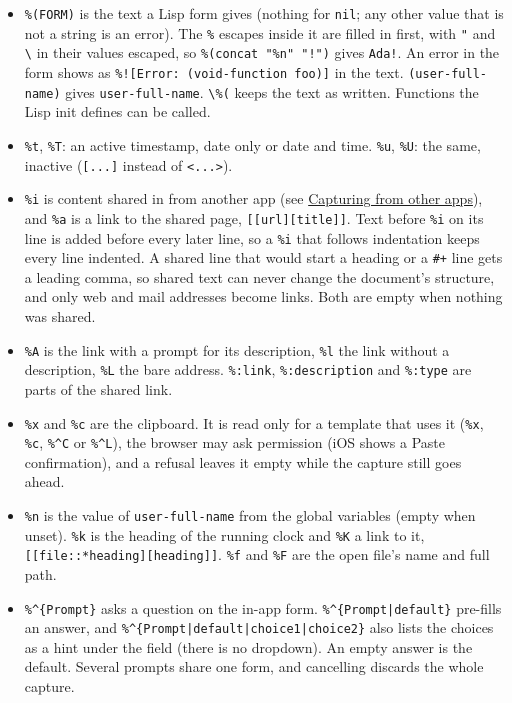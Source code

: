 \documentclass[11pt]{article}
\begin{document}
\begin{itemize}
\item \texttt{\%(FORM)} is the text a Lisp form gives (nothing for \texttt{nil}; any other value that is not a string is an error). The \texttt{\%} escapes inside it are filled in first, with \texttt{"} and \texttt{\textbackslash{}} in their values escaped, so \texttt{\%(concat "\%n" "!")} gives \texttt{Ada!}. An error in the form shows as \texttt{\%![Error: (void-function foo)]} in the text. \texttt{(user-full-name)} gives \texttt{user-full-name}. \texttt{\textbackslash{}\%(} keeps the text as written. Functions the Lisp init defines can be called.
\item \texttt{\%t}, \texttt{\%T}: an active timestamp, date only or date and time. \texttt{\%u}, \texttt{\%U}: the same, inactive (\texttt{[...]} instead of \texttt{<...>}).
\item \texttt{\%i} is content shared in from another app (see \hyperref[sec:org46417ca]{Capturing from other apps}), and \texttt{\%a} is a link to the shared page, \texttt{[[url][title]]}. Text before \texttt{\%i} on its line is added before every later line, so a \texttt{\%i} that follows indentation keeps every line indented. A shared line that would start a heading or a \texttt{\#+} line gets a leading comma, so shared text can never change the document's structure, and only web and mail addresses become links. Both are empty when nothing was shared.
\item \texttt{\%A} is the link with a prompt for its description, \texttt{\%l} the link without a description, \texttt{\%L} the bare address. \texttt{\%:link}, \texttt{\%:description} and \texttt{\%:type} are parts of the shared link.
\item \texttt{\%x} and \texttt{\%c} are the clipboard. It is read only for a template that uses it (\texttt{\%x}, \texttt{\%c}, \texttt{\%\textasciicircum{}C} or \texttt{\%\textasciicircum{}L}), the browser may ask permission (iOS shows a Paste confirmation), and a refusal leaves it empty while the capture still goes ahead.
\item \texttt{\%n} is the value of \texttt{user-full-name} from the global variables (empty when unset). \texttt{\%k} is the heading of the running clock and \texttt{\%K} a link to it, \texttt{[[file::*heading][heading]]}. \texttt{\%f} and \texttt{\%F} are the open file's name and full path.
\item \texttt{\%\textasciicircum{}\{Prompt\}} asks a question on the in-app form. \texttt{\%\textasciicircum{}\{Prompt|default\}} pre-fills an answer, and \texttt{\%\textasciicircum{}\{Prompt|default|choice1|choice2\}} also lists the choices as a hint under the field (there is no dropdown). An empty answer is the default. Several prompts share one form, and cancelling discards the whole capture.

\end{itemize}
\end{document}
